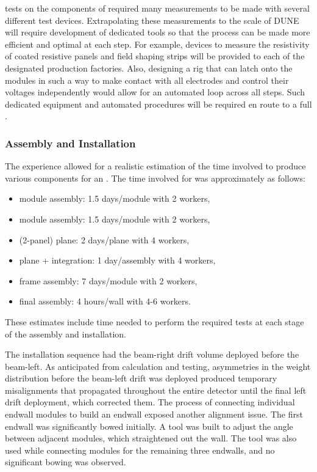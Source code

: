  tests on the  components of  required many measurements to be made with several different test devices.  Extrapolating these measurements to the scale of DUNE will require development of dedicated tools so that the  process can be made more efficient and optimal at each step.
For example, devices to measure the resistivity of  coated resistive panels and field shaping strips will be provided to each of the designated production factories.  Also, designing a rig that can latch onto the  modules in such a way to make contact with all electrodes and control their voltages independently would allow for an automated loop across all steps.
Such dedicated equipment and automated procedures will be required en route to a full .

\subsubsection{Assembly and Installation}
\label{sec:fdsp-hv-protodune-lessons-assy}

The  experience allowed for a realistic estimation of the time involved to produce various  components for an .
The time involved for  was approximately as follows:
\begin{itemize}
\item {} module assembly: 1.5 days/module with 2 workers,
\item {} module assembly: 1.5 days/module with 2 workers, 
\item {} (2-panel) plane: 2 days/plane with 4 workers,
\item {} plane +  integration: 1 day/assembly with 4 workers,
\item {} frame assembly: 7 days/module with 2 workers,
\item {} final assembly: 4 hours/wall with 4-6 workers.
\end{itemize}
These estimates include time needed to perform the required  tests at each stage of the assembly and installation.

The  installation sequence had the beam-right drift volume deployed before the beam-left.
As anticipated from calculation and testing, asymmetries in the weight distribution before the beam-left drift was deployed produced temporary misalignments that propagated throughout the entire detector until the final left drift deployment, which corrected them.
The process of connecting individual endwall modules to build an endwall exposed another alignment issue.
The first endwall was %
significantly bowed initially.
A tool was built to adjust the angle between adjacent modules, which straightened out the wall.
The tool was also used while connecting modules for the remaining three endwalls, and no significant bowing was observed.


